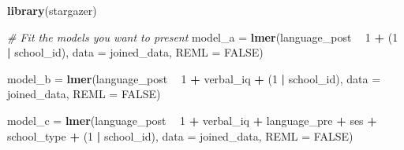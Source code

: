 \documentclass[]{book}
\newenvironment{Shaded}{\begin{snugshade}}{\end{snugshade}}
\newcommand{\CommentTok}[1]{\textcolor[rgb]{0.56,0.35,0.01}{\textit{#1}}}
\newcommand{\DataTypeTok}[1]{\textcolor[rgb]{0.13,0.29,0.53}{#1}}
\newcommand{\DecValTok}[1]{\textcolor[rgb]{0.00,0.00,0.81}{#1}}
\newcommand{\KeywordTok}[1]{\textcolor[rgb]{0.13,0.29,0.53}{\textbf{#1}}}
\newcommand{\NormalTok}[1]{#1}
\newcommand{\OperatorTok}[1]{\textcolor[rgb]{0.81,0.36,0.00}{\textbf{#1}}}
\newcommand{\OtherTok}[1]{\textcolor[rgb]{0.56,0.35,0.01}{#1}}
\newcommand{\StringTok}[1]{\textcolor[rgb]{0.31,0.60,0.02}{#1}}
\begin{document}
\begin{Shaded}
\begin{Highlighting}[]
\KeywordTok{library}\NormalTok{(stargazer)}

\CommentTok{# Fit the models you want to present }
\NormalTok{model_a =}\StringTok{ }\KeywordTok{lmer}\NormalTok{(language_post }\OperatorTok{~}\StringTok{ }\DecValTok{1} \OperatorTok{+}
\StringTok{                }\NormalTok{(}\DecValTok{1} \OperatorTok{|}\StringTok{ }\NormalTok{school_id), }\DataTypeTok{data =}\NormalTok{ joined_data, }\DataTypeTok{REML =} \OtherTok{FALSE}\NormalTok{)}

\NormalTok{model_b =}\StringTok{ }\KeywordTok{lmer}\NormalTok{(language_post }\OperatorTok{~}\StringTok{ }\DecValTok{1} \OperatorTok{+}\StringTok{ }\NormalTok{verbal_iq }\OperatorTok{+}
\StringTok{                }\NormalTok{(}\DecValTok{1} \OperatorTok{|}\StringTok{ }\NormalTok{school_id), }\DataTypeTok{data =}\NormalTok{ joined_data, }\DataTypeTok{REML =} \OtherTok{FALSE}\NormalTok{)}

\NormalTok{model_c =}\StringTok{ }\KeywordTok{lmer}\NormalTok{(language_post }\OperatorTok{~}\StringTok{ }\DecValTok{1} \OperatorTok{+}\StringTok{ }\NormalTok{verbal_iq }\OperatorTok{+}\StringTok{ }\NormalTok{language_pre }\OperatorTok{+}\StringTok{ }\NormalTok{ses }\OperatorTok{+}\StringTok{ }\NormalTok{school_type  }\OperatorTok{+}
\StringTok{                }\NormalTok{(}\DecValTok{1} \OperatorTok{|}\StringTok{ }\NormalTok{school_id), }\DataTypeTok{data =}\NormalTok{ joined_data, }\DataTypeTok{REML =} \OtherTok{FALSE}\NormalTok{)}
    


\end{Highlighting}
\end{Shaded}
\end{document}
